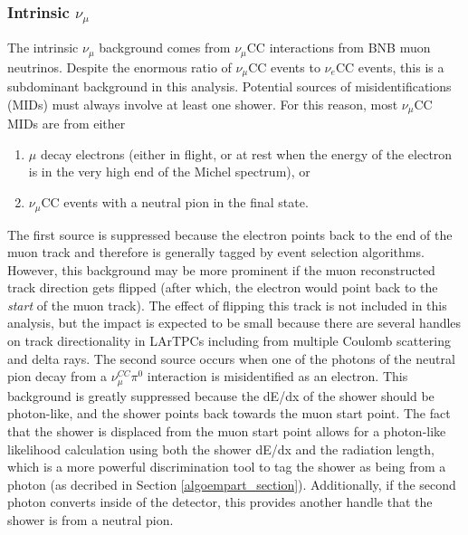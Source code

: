 \subsubsection{Intrinsic $\nu_\mu$}
The intrinsic $\nu_\mu$ background comes from $\nu_\mu$CC interactions from BNB muon neutrinos. Despite the enormous ratio of $\nu_\mu$CC events to $\nu_e$CC events, this is a subdominant background in this analysis. Potential sources of misidentifications (MIDs) must always involve at least one shower. For this reason, most $\nu_\mu$CC MIDs are from either
\begin{enumerate}
\item $\mu$ decay electrons (either in flight, or at rest when the energy of the electron is in the very high end of the Michel spectrum), or 
\item $\nu_\mu$CC events with a neutral pion in the final state. 
\end{enumerate}
The first source is suppressed because the electron points back to the end of the muon track and therefore is generally tagged by event selection algorithms. However, this background may be more prominent if the muon reconstructed track direction gets flipped (after which, the electron would point back to the \textit{start} of the muon track). The effect of flipping this track is not included in this analysis, but the impact is expected to be small because there are several handles on track directionality in LArTPCs including from multiple Coulomb scattering and delta rays. The second source occurs when one of the photons of the neutral pion decay from a $\nu_\mu^{CC}\pi^0$ interaction is misidentified as an electron. This background is greatly suppressed because the dE/dx of the shower should be photon-like, and the shower points back towards the muon start point. The fact that the shower is displaced from the muon start point allows for a photon-like likelihood calculation using both the shower dE/dx and the radiation length, which is a more powerful discrimination tool to tag the shower as being from a photon (as decribed in Section \ref{algoempart_section}). Additionally, if the second photon converts inside of the detector, this provides another handle that the shower is from a neutral pion.


